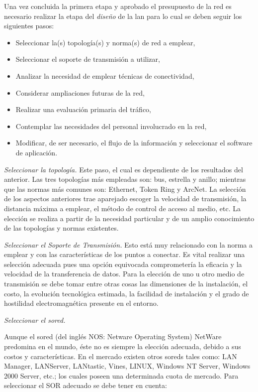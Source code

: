 Una vez concluida la primera etapa y aprobado el presupuesto de la red es necesario realizar la etapa del \textit{diseño} de la \gls{lan} para lo cual se deben seguir los siguientes pasos:

\renewcommand{\labelitemi}{$-$}

\begin{itemize}
\item Seleccionar la(s) topología(s) y norma(s) de red a emplear,
\item Seleccionar el soporte de transmisión a utilizar,
\item Analizar la necesidad de emplear técnicas de conectividad,
\item Considerar ampliaciones futuras de la red,
\item Realizar una evaluación primaria del tráfico,
\item Contemplar las necesidades del personal involucrado en la red,
\item Modificar, de ser necesario, el flujo de la información y seleccionar el software de aplicación.
\end{itemize}

\textit{Seleccionar la topología.} Este paso, el cual es dependiente de los resultados del anterior. Las tres topologías más empleadas son: bus, estrella y anillo; mientras que las normas más comunes son: Ethernet, Token Ring y ArcNet. La selección de los aspectos anteriores trae aparejado escoger la velocidad de transmisión, la distancia máxima a emplear, el método de control de acceso al medio, etc. La elección se realiza a partir de la necesidad particular y de un amplio conocimiento de las topologías y normas existentes. 

\textit{Seleccionar el Soporte de Transmisión.} Esto está muy relacionado con la norma a emplear y con las características de los puntos a conectar. Es vital realizar una selección adecuada pues una opción equivocada comprometería la eficacia y la velocidad de la transferencia de datos. Para la elección de uno u otro medio de transmisión se debe tomar entre otras cosas las dimensiones de la instalación, el costo, la evolución tecnológica estimada, la facilidad de instalación y el grado de hostilidad electromagnética presente en el entorno. 

 
\textit{Seleccionar el \gls{sored}.}

Aunque el \gls{sored}  (del inglés NOS: Netware Operating System) NetWare predomina en el mundo, éste no es siempre la elección adecuada, debido a sus costos y características. En el mercado existen otros \glspl{sored} tales como: LAN Manager, LANServer, LANtastic, Vines, LINUX, Windows NT Server, Windows 2000 Server, etc.; los cuales poseen una determinada cuota de mercado. Para seleccionar el SOR adecuado se debe tener en cuenta:

